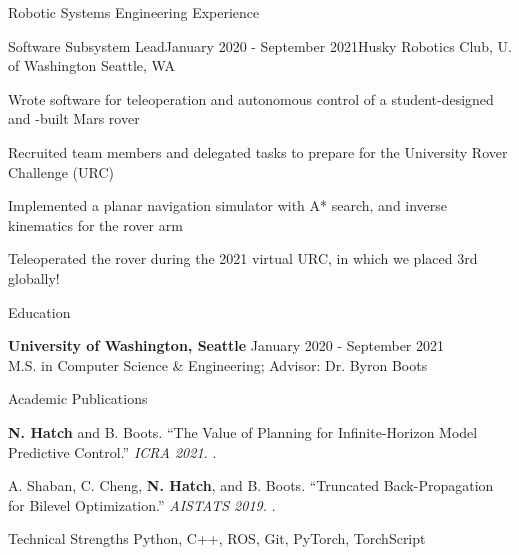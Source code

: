\documentclass{resume} %
\begin{document}
\begin{rSection}{Robotic Systems Engineering Experience}
\begin{rSubsection}{Software Subsystem Lead}{January 2020 - September 2021}{Husky Robotics Club, U. of Washington}{ Seattle, WA}
\item Wrote software for teleoperation and autonomous control of a student-designed and -built Mars rover
\item Recruited team members and delegated tasks to prepare for the University Rover Challenge (URC)
\item Implemented a planar navigation simulator with A* search, and inverse kinematics for the rover arm
\item Teleoperated the rover during the 2021 virtual URC, in which we placed 3rd globally!
\end{rSubsection}

\end{rSection}


\begin{rSection}{Education}

{\bf University of Washington, Seattle} \hfill {January 2020 - September 2021} \\
M.S. in Computer Science \& Engineering; Advisor: Dr. Byron Boots

\end{rSection}

\begin{rSection}{Academic Publications}

{\bf N. Hatch} and B. Boots. ``The Value of Planning for Infinite-Horizon Model Predictive Control.''
{\em ICRA 2021.}
.

A. Shaban, C. Cheng, {\bf N. Hatch}, and B. Boots. ``Truncated Back-Propagation for Bilevel Optimization.''
{\em AISTATS 2019.}
.

\end{rSection}

\begin{rSection}{Technical Strengths}
Python, C++, ROS, Git, PyTorch, TorchScript
\end{rSection}
\end{document}
